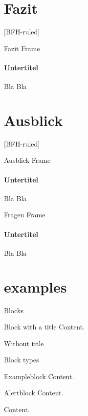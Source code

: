 \documentclass[
	ngerman,%
	authorontitle=true,
	]{bfhbeamer}
\begin{document}
\section{Fazit}\label{sec:fazit}
[BFH-ruled]
\frame{\sectionpage}

\begin{frame}{Fazit Frame}
	\framesubtitle{Untertitel}
	Bla Bla
\end{frame}

\section{Ausblick}\label{sec:ausblick}
[BFH-ruled]
\frame{\sectionpage}

\begin{frame}{Ausblick Frame}
	\framesubtitle{Untertitel}
	Bla Bla
\end{frame}

\begin{frame}{Fragen Frame}
	\framesubtitle{Untertitel}
	Bla Bla
\end{frame}

\section{examples}\label{sec:examples}
\begin{frame}{Blocks}
	\begin{block}{Block with a title}
		Content.
	\end{block}
	\begin{block}{}
		Without title
	\end{block}
\end{frame}

\begin{frame}{Block types}
	\begin{exampleblock}{Exampleblock}
		Content.
	\end{exampleblock}
	\begin{alertblock}{Alertblock}
		Content.
	\end{alertblock}
	\begin{example}
		Content.
	\end{example}
\end{frame}
\end{document}
